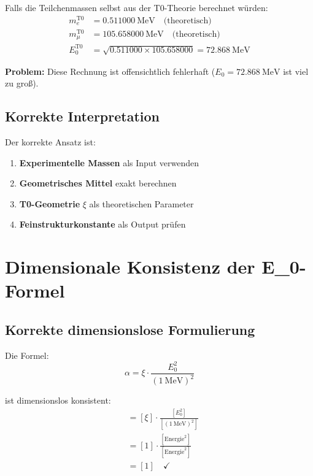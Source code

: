 	Falls die Teilchenmassen selbst aus der T0-Theorie berechnet würden:
	\begin{align}
		m_e^{\text{T0}} &= \SI{0.511000}{\MeV} \quad \text{(theoretisch)} \\
		m_\mu^{\text{T0}} &= \SI{105.658000}{\MeV} \quad \text{(theoretisch)} \\
		E_0^{\text{T0}} &= \sqrt{0.511000 \times 105.658000} = \SI{72.868}{\MeV}
	\end{align}
	
	\textbf{Problem:} Diese Rechnung ist offensichtlich fehlerhaft ($E_0 = \SI{72.868}{\MeV}$ ist viel zu groß{}).
	
	\subsection{Korrekte Interpretation}
	
	Der korrekte Ansatz ist:
	\begin{enumerate}
		\item \textbf{Experimentelle Massen} als Input verwenden
		\item \textbf{Geometrisches Mittel} exakt berechnen  
		\item \textbf{T0-Geometrie} $\xi$ als theoretischen Parameter
		\item \textbf{Feinstrukturkonstante} als Output prüfen
	\end{enumerate}
	
	\section{Dimensionale Konsistenz der E\_0-Formel}
	
	\subsection{Korrekte dimensionslose Formulierung}
	
	Die Formel:
	\begin{equation}
		\alpha = \xi \cdot \frac{E_0^2}{( \SI{1}{\MeV} )^2}
	\end{equation}
	
	ist dimensionslos konsistent:
	\begin{align}
		[\alpha] &= [\xi] \cdot \frac{[E_0^2]}{[( \SI{1}{\MeV} )^2]} \\
		&= [1] \cdot \frac{[\text{Energie}^2]}{[\text{Energie}^2]} \\
		&= [1] \quad \checkmark
	\end{align}
	
